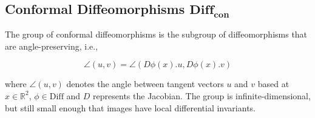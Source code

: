 \documentclass[review,onefignum,onetabnum]{siamonline190516}
\begin{document}
{\subsection{Conformal Diffeomorphisms $\mathbf{Diff}_{\mathbf{con}}$}

The group of conformal diffeomorphisms is the subgroup of diffeomorphisms that are angle-preserving, i.e.,

\begin{equation}
\angle (u,v) = \angle (D \phi(x) . u, D \phi(x).v)
\end{equation}

\noindent where $\angle(u, v)$ denotes the angle between tangent vectors
$u$ and $v$ based at $x \in \mathbb{R}^2$, $\phi \in \textrm{Diff}$ and $D$
represents the Jacobian. The group is infinite-dimensional, but still small
enough that images have local differential invariants. 

}
\end{document}
